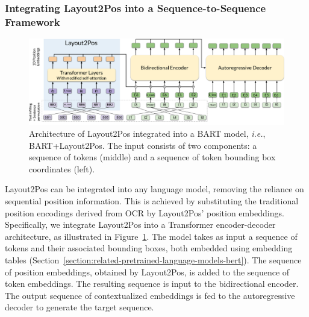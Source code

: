 
\subsubsection{Integrating Layout2Pos into a Sequence-to-Sequence Framework}

\begin{figure}
  \centering
  \includegraphics[width=\textwidth]{images/chapter4/Layout2Pos+BART.pdf}
  \caption{Architecture of Layout2Pos integrated into a BART model, \textit{i.e.}, BART+Layout2Pos. The input consists of two components: a sequence of tokens (middle) and a sequence of token bounding box coordinates (left).}
  \label{fig:layout2pos-ed}
\end{figure}

Layout2Pos can be integrated into any language model, removing the reliance on sequential position information. This is achieved by substituting the traditional position encodings derived from \ac{OCR} by Layout2Pos' position embeddings. Specifically, we integrate Layout2Pos into a Transformer encoder-decoder architecture, as illustrated in Figure~\ref{fig:layout2pos-ed}. The model takes as input a sequence of tokens and their associated bounding boxes, both embedded using embedding tables (Section~\ref{section:related-pretrained-language-models-bert}). The sequence of position embeddings, obtained by Layout2Pos, is added to the sequence of token embeddings. The resulting sequence is input to the bidirectional encoder. The output sequence of contextualized embeddings is fed to the autoregressive decoder to generate the target sequence.


